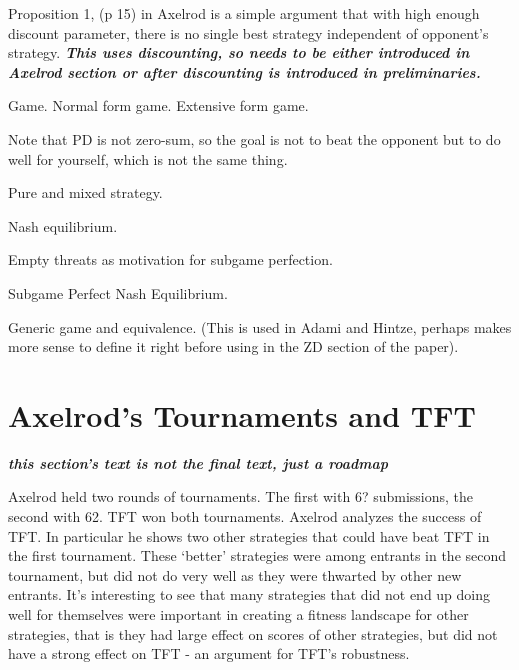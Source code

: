 Proposition 1, (p 15) in Axelrod is a simple argument that with high enough discount parameter, there is no single best strategy independent of opponent's strategy. \textit{\textbf{This uses discounting, so needs to be either introduced in Axelrod section or after discounting is introduced in preliminaries.}}


\begin{definition}Game. Normal form game. Extensive form game.
\end{definition}

Note that PD is not zero-sum, so the goal is not to beat the opponent but to do well for yourself, which is not the same thing.

\begin{definition}Pure and mixed strategy.
\end{definition}

\begin{definition}Nash equilibrium.
\end{definition}

Empty threats as motivation for subgame perfection.

\begin{definition}Subgame Perfect Nash Equilibrium.
\end{definition}


\begin{definition}
Generic game and equivalence. (This is used in Adami and Hintze, perhaps makes more sense to define it right before using in the ZD section of the paper).
\end{definition}

\chapter{Axelrod's Tournaments and TFT}

\textit{\textbf{this section's text is not the final text, just a roadmap}}

Axelrod held two rounds of tournaments. The first with 6? submissions, the second with 62. TFT won both tournaments. Axelrod analyzes the success of TFT. In particular he shows two other strategies that could have beat TFT in the first tournament. These `better' strategies were among entrants in the second tournament, but did not do very well as they were thwarted by other new entrants. It's interesting to see that many strategies that did not end up doing well for themselves were important in creating a fitness landscape for other strategies, that is they had large effect on scores of other strategies, but did not have a strong effect on TFT - an argument for TFT's robustness.

